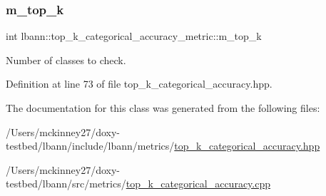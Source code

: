 \subsubsection{\texorpdfstring{m\+\_\+top\+\_\+k}{m\_top\_k}}
{\footnotesize\ttfamily int lbann\+::top\+\_\+k\+\_\+categorical\+\_\+accuracy\+\_\+metric\+::m\+\_\+top\+\_\+k\hspace{0.3cm}{\ttfamily [private]}}

Number of classes to check. 

Definition at line 73 of file top\+\_\+k\+\_\+categorical\+\_\+accuracy.\+hpp.



The documentation for this class was generated from the following files\+:\begin{DoxyCompactItemize}
\item 
/\+Users/mckinney27/doxy-\/testbed/lbann/include/lbann/metrics/\hyperlink{top__k__categorical__accuracy_8hpp}{top\+\_\+k\+\_\+categorical\+\_\+accuracy.\+hpp}\item 
/\+Users/mckinney27/doxy-\/testbed/lbann/src/metrics/\hyperlink{top__k__categorical__accuracy_8cpp}{top\+\_\+k\+\_\+categorical\+\_\+accuracy.\+cpp}\end{DoxyCompactItemize}
